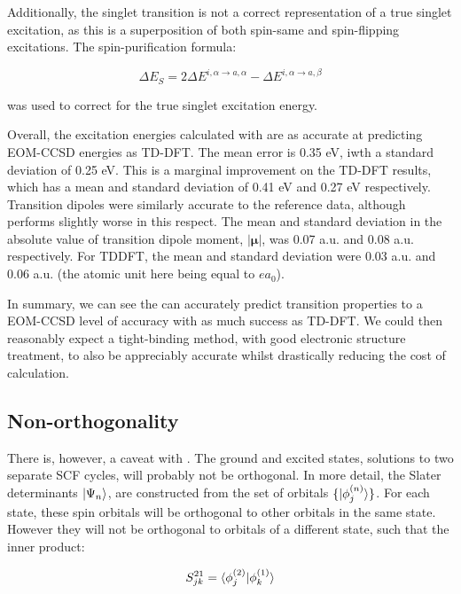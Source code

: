Additionally, the \dscf singlet transition is not a correct representation of a 
true singlet excitation, as this is a superposition of both spin-same and spin-flipping
excitations. The spin-purification formula:

\begin{equation}
\Delta E_S = 2\Delta E^{i,\alpha \rightarrow a, \alpha} - \Delta E^{i,\alpha \rightarrow a, \beta}
\end{equation}

was used to correct for the true singlet excitation energy.

Overall, the excitation energies calculated with \dscf are as accurate at predicting
EOM-CCSD energies as TD-DFT. The mean error is 0.35 eV, iwth a standard deviation
of 0.25 eV. This is a marginal improvement on the TD-DFT results, which has a mean
and standard deviation of 0.41 eV and 0.27 eV respectively. Transition dipoles 
were similarly accurate to the reference data, although \dscf performs slightly 
worse in this respect. The mean and standard deviation in the absolute value
of transition dipole moment, $|\mathbf{\mu}|$, was 0.07 a.u. and 0.08 a.u. respectively.
For TDDFT, the mean and standard deviation were 0.03 a.u. and 0.06 a.u. (the atomic
unit here being equal to $ea_0$).

In summary, we can see the \dscf can accurately predict transition properties
to a EOM-CCSD level of accuracy with as much success as TD-DFT.
We could then reasonably expect a tight-binding method, with good electronic 
structure treatment, to also be appreciably accurate whilst drastically reducing
the cost of calculation. 

\subsection{Non-orthogonality}
\label{subsec:dscf_nonorth}
There is, however, a caveat with \dscf. The ground and excited states, solutions
to two separate SCF cycles, will probably not be orthogonal. In more detail, the
Slater determinants $\ket{\Psi_n}$, are constructed from the set of orbitals 
$\{ \ket{\phi_j^{\left(n\right)}} \}$. For each state, these spin orbitals
will be orthogonal to other orbitals in the same state. However they will not be
orthogonal to orbitals of a different state, such that the inner product:

\begin{equation}
S^{21}_{jk} = \braket{\phi_j^{\left(2\right)} | \phi_k^{\left(1\right)}}
\end{equation}

